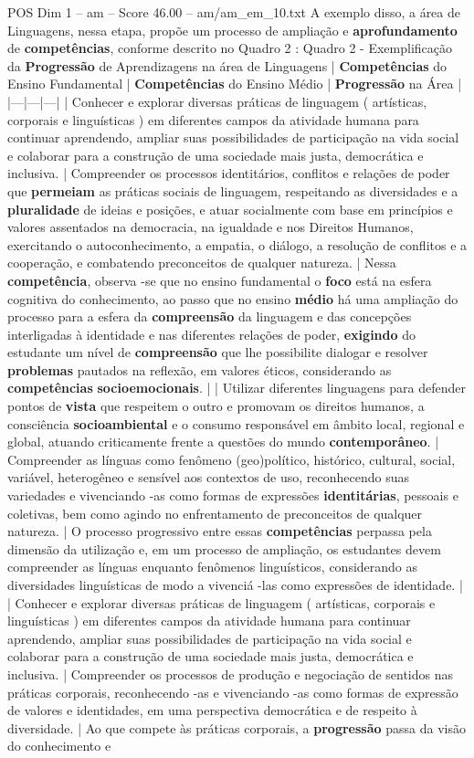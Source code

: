 \begin{textsample}{POS Dim 1 – am – Score 46.00 – am/am\_em\_10.txt}
A exemplo disso, a área de Linguagens, nessa etapa, propõe um processo de ampliação e \textbf{aprofundamento} de \textbf{competências}, conforme descrito no Quadro 2 : Quadro 2 - Exemplificação da \textbf{Progressão} de Aprendizagens na área de Linguagens | \textbf{Competências} do Ensino Fundamental | \textbf{Competências} do Ensino Médio | \textbf{Progressão} na Área | |---|---|---| | Conhecer e explorar diversas práticas de linguagem ( artísticas, corporais e linguísticas ) em diferentes campos da atividade humana para continuar aprendendo, ampliar suas possibilidades de participação na vida social e colaborar para a construção de uma sociedade mais justa, democrática e inclusiva. | Compreender os processos identitários, conflitos e relações de poder que \textbf{permeiam} as práticas sociais de linguagem, respeitando as diversidades e a \textbf{pluralidade} de ideias e posições, e atuar socialmente com base em princípios e valores assentados na democracia, na igualdade e nos Direitos Humanos, exercitando o autoconhecimento, a empatia, o diálogo, a resolução de conflitos e a cooperação, e combatendo preconceitos de qualquer natureza. | Nessa \textbf{competência}, observa -se que no ensino fundamental o \textbf{foco} está na esfera cognitiva do conhecimento, ao passo que no ensino \textbf{médio} há uma ampliação do processo para a esfera da \textbf{compreensão} da linguagem e das concepções interligadas à identidade e nas diferentes relações de poder, \textbf{exigindo} do estudante um nível de \textbf{compreensão} que lhe possibilite dialogar e resolver \textbf{problemas} pautados na reflexão, em valores éticos, considerando as \textbf{competências} \textbf{socioemocionais}. | | Utilizar diferentes linguagens para defender pontos de \textbf{vista} que respeitem o outro e promovam os direitos humanos, a consciência \textbf{socioambiental} e o consumo responsável em âmbito local, regional e global, atuando criticamente frente a questões do mundo \textbf{contemporâneo}. | Compreender as línguas como fenômeno (geo)político, histórico, cultural, social, variável, heterogêneo e sensível aos contextos de uso, reconhecendo suas variedades e vivenciando -as como formas de expressões \textbf{identitárias}, pessoais e coletivas, bem como agindo no enfrentamento de preconceitos de qualquer natureza. | O processo progressivo entre essas \textbf{competências} perpassa pela dimensão da utilização e, em um processo de ampliação, os estudantes devem compreender as línguas enquanto fenômenos linguísticos, considerando as diversidades linguísticas de modo a vivenciá -las como expressões de identidade. | | Conhecer e explorar diversas práticas de linguagem ( artísticas, corporais e linguísticas ) em diferentes campos da atividade humana para continuar aprendendo, ampliar suas possibilidades de participação na vida social e colaborar para a construção de uma sociedade mais justa, democrática e inclusiva. | Compreender os processos de produção e negociação de sentidos nas práticas corporais, reconhecendo -as e vivenciando -as como formas de expressão de valores e identidades, em uma perspectiva democrática e de respeito à diversidade. | Ao que compete às práticas corporais, a \textbf{progressão} passa da visão do conhecimento e 
\end{textsample}
